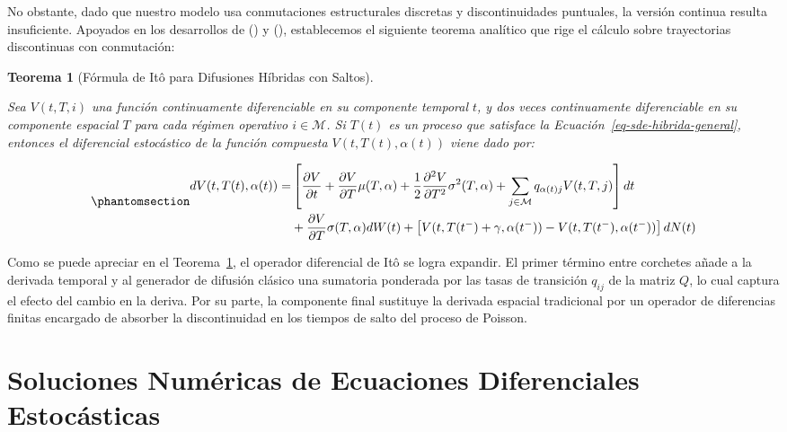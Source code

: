 \documentclass[
  spanish,
  letterpaper,
  DIV=11,
  numbers=noendperiod]{scrreprt}
\theoremstyle{plain}
\newtheorem{theorem}{Teorema}[chapter]
\theoremstyle{definition}
\theoremstyle{remark}
\begin{document}
No obstante, dado que nuestro modelo usa conmutaciones estructurales
discretas y discontinuidades puntuales, la versión continua resulta
insuficiente. Apoyados en los desarrollos de
() y
(),
establecemos el siguiente teorema analítico que rige el cálculo sobre
trayectorias discontinuas con conmutación:

\begin{theorem}[Fórmula de Itô para Difusiones Híbridas con
Saltos]\protect\hypertarget{thm-ito-generalizado}{}\label{thm-ito-generalizado}

Sea \(V(t, T, i)\) una función continuamente diferenciable en su
componente temporal \(t\), y dos veces continuamente diferenciable en su
componente espacial \(T\) para cada régimen operativo
\(i \in \mathcal{M}\). Si \(T(t)\) es un proceso que satisface la
Ecuación~\ref{eq-sde-hibrida-general}, entonces el diferencial
estocástico de la función compuesta \(V(t, T(t), \alpha(t))\) viene dado
por:

\begin{equation}\phantomsection\label{eq-ito-generalizado}{
\begin{aligned}
dV(t, T(t), \alpha(t)) = & \left[ \frac{\partial V}{\partial t} + \frac{\partial V}{\partial T}\mu(T, \alpha) + \frac{1}{2}\frac{\partial^2 V}{\partial T^2}\sigma^2(T, \alpha) + \sum_{j \in \mathcal{M}} q_{\alpha(t)j}V(t, T, j) \right] dt \\
& + \frac{\partial V}{\partial T}\sigma(T, \alpha) dW(t) + \left[ V(t, T(t^-) + \gamma, \alpha(t^-)) - V(t, T(t^-), \alpha(t^-)) \right] dN(t)
\end{aligned}
}\end{equation}

\end{theorem}

Como se puede apreciar en el Teorema~\ref{thm-ito-generalizado}, el
operador diferencial de Itô se logra expandir. El primer término entre
corchetes añade a la derivada temporal y al generador de difusión
clásico una sumatoria ponderada por las tasas de transición \(q_{ij}\)
de la matriz \(Q\), lo cual captura el efecto del cambio en la deriva.
Por su parte, la componente final sustituye la derivada espacial
tradicional por un operador de diferencias finitas encargado de absorber
la discontinuidad en los tiempos de salto del proceso de Poisson.

\section{Soluciones Numéricas de Ecuaciones Diferenciales
Estocásticas}\label{soluciones-numuxe9ricas-de-ecuaciones-diferenciales-estocuxe1sticas}
\end{document}
